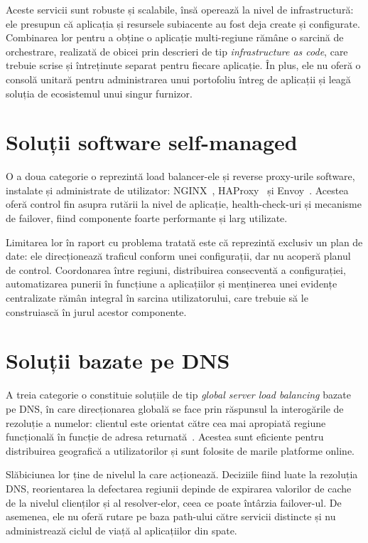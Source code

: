 \documentclass[12pt,a4paper]{report}
\begin{document}
Aceste servicii sunt robuste și scalabile, însă operează la nivel de infrastructură: ele presupun că aplicația și resursele subiacente au fost deja create și configurate. Combinarea lor pentru a obține o aplicație multi-regiune rămâne o sarcină de orchestrare, realizată de obicei prin descrieri de tip \emph{infrastructure as code}, care trebuie scrise și întreținute separat pentru fiecare aplicație. În plus, ele nu oferă o consolă unitară pentru administrarea unui portofoliu întreg de aplicații și leagă soluția de ecosistemul unui singur furnizor.

\section{Soluții software self-managed}
O a doua categorie o reprezintă load balancer-ele și reverse proxy-urile software, instalate și administrate de utilizator: NGINX~\cite{nginx-lb}, HAProxy~\cite{haproxy} și Envoy~\cite{envoy}. Acestea oferă control fin asupra rutării la nivel de aplicație, health-check-uri și mecanisme de failover, fiind componente foarte performante și larg utilizate.

Limitarea lor în raport cu problema tratată este că reprezintă exclusiv un plan de date: ele direcționează traficul conform unei configurații, dar nu acoperă planul de control. Coordonarea între regiuni, distribuirea consecventă a configurației, automatizarea punerii în funcțiune a aplicațiilor și menținerea unei evidențe centralizate rămân integral în sarcina utilizatorului, care trebuie să le construiască în jurul acestor componente.

\section{Soluții bazate pe DNS}
A treia categorie o constituie soluțiile de tip \emph{global server load balancing} bazate pe DNS, în care direcționarea globală se face prin răspunsul la interogările de rezoluție a numelor: clientul este orientat către cea mai apropiată regiune funcțională în funcție de adresa returnată~\cite{cloudflare-lb}. Acestea sunt eficiente pentru distribuirea geografică a utilizatorilor și sunt folosite de marile platforme online.

Slăbiciunea lor ține de nivelul la care acționează. Deciziile fiind luate la rezoluția DNS, reorientarea la defectarea regiunii depinde de expirarea valorilor de cache de la nivelul clienților și al resolver-elor, ceea ce poate întârzia failover-ul. De asemenea, ele nu oferă rutare pe baza path-ului către servicii distincte și nu administrează ciclul de viață al aplicațiilor din spate.
\end{document}

